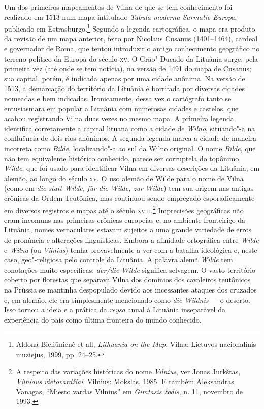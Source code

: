 Um dos primeiros mapeamentos de Vilna de que se tem conhecimento foi
realizado em 1513 num mapa intitulado \textit{Tabula moderna Sarmatie
Europa}, publicado em Estrasburgo.\footnote{Aldona Bieliūnienė et all, \textit{Lithuania on the Map}. Vilna: Lietuvos nacionalinis muziejus, 1999, pp. 24--25.} Segundo a legenda cartográfica, o mapa era produto da revisão de um mapa anterior, feito por Nicolaus Cusanus
(1401--1464), cardeal e governador de Roma, que tentou introduzir o
antigo conhecimento geográfico no terreno político da Europa do século
\textsc{xv}. O Grão"-Ducado da Lituânia surge, pela primeira vez (até onde se tem
notícia), na versão de 1491 do mapa de Cusanus; sua capital, porém, é
indicada apenas por uma cidade anônima. Na versão de 1513, a demarcação
do território da Lituânia é borrifada por diversas cidades nomeadas e
bem indicadas. Ironicamente, dessa vez o cartógrafo tanto se
entusiasmara em popular a Lituânia com numerosas cidades e castelos, que
acabou registrando Vilna duas vezes no mesmo mapa. A primeira legenda
identifica corretamente a capital lituana como a cidade de \textit{Wilno},
situando"-a na confluência de dois rios anônimos. A segunda legenda marca
a cidade de maneira incorreta como \textit{Bilde}, localizando"-a ao sul da
Wilno original. O nome \textit{Bilde}, que não tem equivalente histórico
conhecido, parece ser corruptela do topônimo \textit{Wilde}, que foi usado
para identificar Vilna em diversas descrições da Lituânia, em alemão, ao
longo do século \textsc{xv}. O uso alemão de Wilde para o nome de Vilna (como em
\textit{die statt Wilde, für die Wilde, zur Wilde}) tem sua origem nas
antigas crônicas da Ordem Teutônica, mas continuou sendo empregado
esporadicamente em diversos registros e mapas até o século \textsc{xviii}.\footnote{A respeito das variações históricas do nome \textit{Vilnius}, ver Jonas Jurkštas, \textit{Vilniaus vietovardžiai}. Vilnius: Mokslas, 1985. E também Aleksandras Vanagas, ``Miesto vardas Vilnius'' em \textit{Gimtasis žodis}, n. 11, novembro de 1993.}
Imprecisões geográficas não eram incomuns nas primeiras crônicas
europeias e, no ambiente fronteiriço da Lituânia, nomes vernaculares
estavam sujeitos a uma grande variedade de erros de pronúncia e
alterações linguísticas. Embora a afinidade ortográfica entre
\textit{Wilde} e \textit{Wilna} (ou \textit{Vilnius}) tenha provavelmente a ver com a
batalha ideológica e, neste caso, geo"-religiosa pelo controle da
Lituânia. A palavra alemã \textit{Wilde} tem conotações muito específicas:
\textit{der/die Wilde} significa selvagem. O vasto território coberto por
florestas que separava Vilna dos domínios dos cavaleiros teutônicos na
Prússia se mantinha despopulado devido aos incessantes ataques dos
cruzados e, em alemão, ele era simplesmente mencionado como \textit{die
Wildnis} --- o deserto. Isso tornou a ideia e a prática da \textit{reysa}
anual à Lituânia inseparável da experiência do país como última
fronteira do mundo conhecido.

